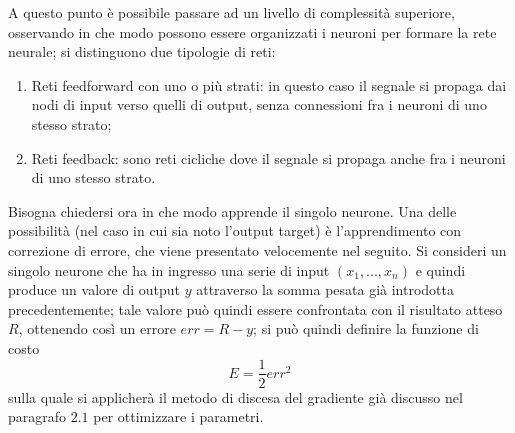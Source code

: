 \newpage
A questo punto è possibile passare ad un livello di complessità superiore, osservando in che modo possono essere organizzati i neuroni per formare la rete neurale; si distinguono due tipologie di reti:
\begin{enumerate}
	\item Reti feedforward con uno o più strati: in questo caso il segnale si propaga dai nodi di input verso quelli di output, senza connessioni fra i neuroni di uno stesso strato;
	\item Reti feedback: sono reti cicliche dove il segnale si propaga anche fra i neuroni di uno stesso strato.
\end{enumerate}
Bisogna chiedersi ora in che modo apprende il singolo neurone. Una delle possibilità (nel caso in cui sia noto l'output target) è l'apprendimento con correzione di errore, che viene presentato velocemente nel seguito.
Si consideri un singolo neurone che ha in ingresso una serie di input $(x_1,...,x_n)$ e quindi produce un valore di output $y$ attraverso la somma pesata già introdotta precedentemente; tale valore può quindi essere confrontata con il risultato atteso $R$, ottenendo così un errore $err = R - y$; si può quindi definire la funzione di costo
\begin{equation}
	E = \frac{1}{2}err^2
\end{equation}
sulla quale si applicherà il metodo di discesa del gradiente già discusso nel paragrafo $2.1$ per ottimizzare i parametri.

